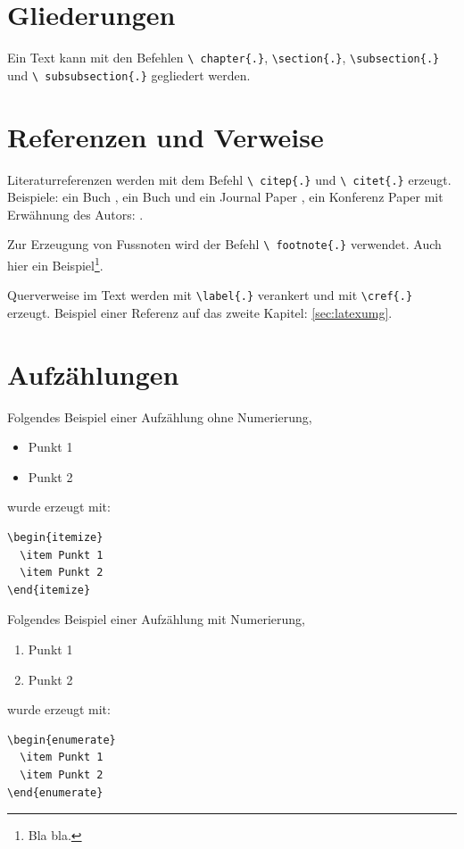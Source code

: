 \section{Gliederungen}
\label{sec:gliederung}

Ein Text kann mit den Befehlen \texttt{\textbackslash
chapter\{.\}}, \texttt{\textbackslash section\{.\}},
\texttt{\textbackslash subsection\{.\}} und \texttt{\textbackslash
subsubsection\{.\}} gegliedert werden.


\section{Referenzen und Verweise}
\label{sec:refverw}

Literaturreferenzen werden mit dem Befehl \texttt{\textbackslash
citep\{.\}} und \texttt{\textbackslash
citet\{.\}} erzeugt. Beispiele: ein Buch \citep{Raibert1986LeggedRobotsThatBalance}, ein Buch und ein Journal Paper \citep{Raibert1986LeggedRobotsThatBalance,Vukobratovic2004ZeroMomentPoint}, ein Konferenz Paper mit Erwähnung des Autors: \citet{Pratt1995SEA}.

Zur Erzeugung von Fussnoten wird der Befehl \texttt{\textbackslash
footnote\{.\}} verwendet. Auch hier ein Beispiel\footnote{Bla
bla.}.

Querverweise im Text werden mit \texttt{\textbackslash label\{.\}}
verankert und mit \texttt{\textbackslash cref\{.\}} erzeugt.
Beispiel einer Referenz auf das zweite Kapitel:
\cref{sec:latexumg}.


\section{Aufzählungen}\label{sec:aufz}

Folgendes Beispiel einer Aufzählung ohne Numerierung,
\begin{itemize}
  \item Punkt 1
  \item Punkt 2
\end{itemize}
wurde erzeugt mit:
\begin{verbatim}
\begin{itemize}
  \item Punkt 1
  \item Punkt 2
\end{itemize}
\end{verbatim}

Folgendes Beispiel einer Aufzählung mit Numerierung,
\begin{enumerate}
  \item Punkt 1
  \item Punkt 2
\end{enumerate}
wurde erzeugt mit:
\begin{verbatim}
\begin{enumerate}
  \item Punkt 1
  \item Punkt 2
\end{enumerate}
\end{verbatim}

